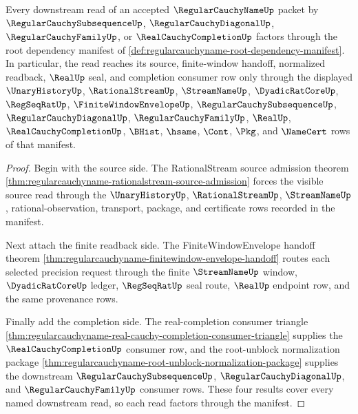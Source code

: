 \begin{theorem}
\label{thm:regularcauchyname-root-dependency-manifest-exhaustion}
Every downstream read of an accepted $\RegularCauchyNameUp$ packet by $\RegularCauchySubsequenceUp$, $\RegularCauchyDiagonalUp$, $\RegularCauchyFamilyUp$, or $\RealCauchyCompletionUp$ factors through the root dependency manifest of \autoref{def:regularcauchyname-root-dependency-manifest}. In particular, the read reaches its source, finite-window handoff, normalized readback, $\RealUp$ seal, and completion consumer row only through the displayed $\UnaryHistoryUp$, $\RationalStreamUp$, $\StreamNameUp$, $\DyadicRatCoreUp$, $\RegSeqRatUp$, $\FiniteWindowEnvelopeUp$, $\RegularCauchySubsequenceUp$, $\RegularCauchyDiagonalUp$, $\RegularCauchyFamilyUp$, $\RealUp$, $\RealCauchyCompletionUp$, $\BHist$, $\hsame$, $\Cont$, $\Pkg$, and $\NameCert$ rows of that manifest.
\end{theorem}
\begin{proof}
Begin with the source side. The RationalStream source admission theorem \autoref{thm:regularcauchyname-rationalstream-source-admission} forces the visible source read through the $\UnaryHistoryUp$, $\RationalStreamUp$, $\StreamNameUp$, rational-observation, transport, package, and certificate rows recorded in the manifest.

Next attach the finite readback side. The FiniteWindowEnvelope handoff theorem \autoref{thm:regularcauchyname-finitewindow-envelope-handoff} routes each selected precision request through the finite $\StreamNameUp$ window, $\DyadicRatCoreUp$ ledger, $\RegSeqRatUp$ seal route, $\RealUp$ endpoint row, and the same provenance rows.

Finally add the completion side. The real-completion consumer triangle \autoref{thm:regularcauchyname-real-cauchy-completion-consumer-triangle} supplies the $\RealCauchyCompletionUp$ consumer row, and the root-unblock normalization package \autoref{thm:regularcauchyname-root-unblock-normalization-package} supplies the downstream $\RegularCauchySubsequenceUp$, $\RegularCauchyDiagonalUp$, and $\RegularCauchyFamilyUp$ consumer rows. These four results cover every named downstream read, so each read factors through the manifest.
\end{proof}


